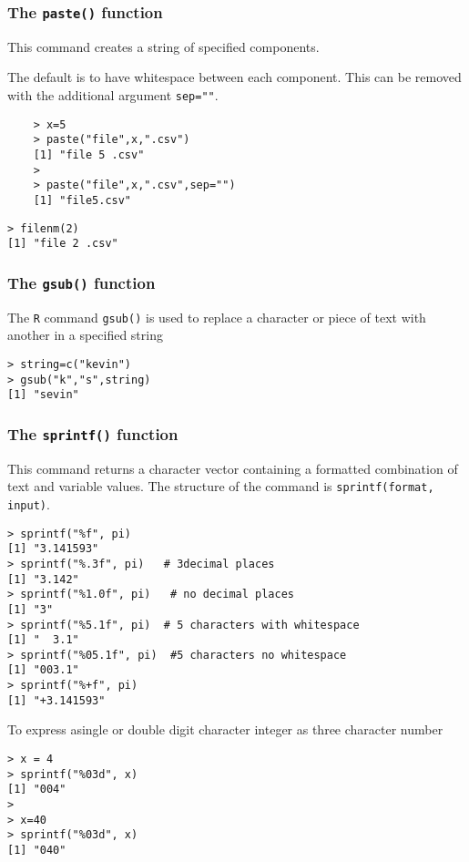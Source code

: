 \documentclass[12pt]{article}
\begin{document}
\subsubsection*{The \texttt{paste()} function}
This command creates a string of specified components. 

\noindent The default is to have whitespace between each component. This can be removed with the additional argument \texttt{sep=""}.
\begin{framed}
	\begin{verbatim}
	> x=5
	> paste("file",x,".csv")
	[1] "file 5 .csv"
	>
	> paste("file",x,".csv",sep="")
	[1] "file5.csv"
	\end{verbatim}
\end{framed}
\begin{verbatim}
> filenm(2)
[1] "file 2 .csv"
\end{verbatim}
\subsubsection*{The \texttt{gsub()} function}
The \texttt{R} command \texttt{gsub()} is used to replace a character or piece of text with another in a specified string
\begin{verbatim}
> string=c("kevin")
> gsub("k","s",string)
[1] "sevin"
\end{verbatim}
\newpage

\subsubsection*{The \texttt{sprintf()} function}
This command returns a character vector containing a formatted combination of text and variable values. The structure of the command is \texttt{sprintf(format, input)}.
\begin{verbatim}
> sprintf("%f", pi)     
[1] "3.141593"
> sprintf("%.3f", pi)   # 3decimal places
[1] "3.142"
> sprintf("%1.0f", pi)   # no decimal places
[1] "3"
> sprintf("%5.1f", pi)  # 5 characters with whitespace
[1] "  3.1"  
> sprintf("%05.1f", pi)  #5 characters no whitespace
[1] "003.1"
> sprintf("%+f", pi)
[1] "+3.141593"
\end{verbatim}

\noindent To express asingle or double digit character integer as three character number
\begin{verbatim}
> x = 4
> sprintf("%03d", x)
[1] "004"
> 
> x=40
> sprintf("%03d", x)
[1] "040"
\end{verbatim}
\end{document}
